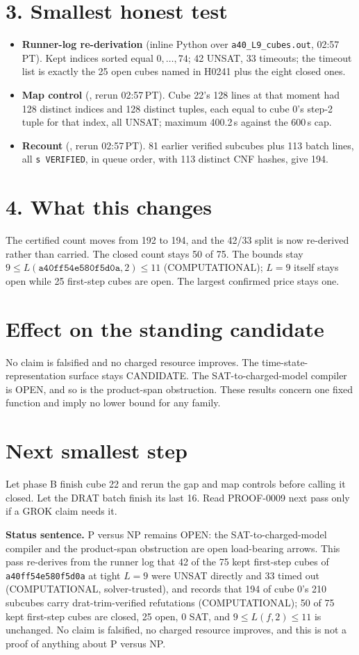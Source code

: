 \documentclass[11pt]{article}
\begin{document}
\section*{3. Smallest honest test}
\begin{itemize}
\item \textbf{Runner-log re-derivation} (inline Python over \texttt{a40\_L9\_cubes.out}, 02:57\,PT). Kept indices sorted equal $0,\dots,74$; 42 UNSAT, 33 timeouts; the timeout list is exactly the 25 open cubes named in H0241 plus the eight closed ones.
\item \textbf{Map control} (, rerun 02:57\,PT). Cube 22's 128 lines at that moment had 128 distinct indices and 128 distinct tuples, each equal to cube 0's step-2 tuple for that index, all UNSAT; maximum 400.2\,s against the 600\,s cap.
\item \textbf{Recount} (, rerun 02:57\,PT). 81 earlier verified subcubes plus 113 batch lines, all \texttt{s VERIFIED}, in queue order, with 113 distinct CNF hashes, give 194.
\end{itemize}

\section*{4. What this changes}
The certified count moves from 192 to 194, and the 42/33 split is now re-derived rather than carried. The closed count stays 50 of 75. The bounds stay $9\le L(\texttt{a40ff54e580f5d0a},2)\le 11$ (COMPUTATIONAL); $L=9$ itself stays open while 25 first-step cubes are open. The largest confirmed price stays one.

\section*{Effect on the standing candidate}
No claim is falsified and no charged resource improves. The time-state-representation surface stays CANDIDATE. The SAT-to-charged-model compiler is OPEN, and so is the product-span obstruction. These results concern one fixed function and imply no lower bound for any family.

\section*{Next smallest step}
Let phase B finish cube 22 and rerun the gap and map controls before calling it closed. Let the DRAT batch finish its last 16. Read PROOF-0009 next pass only if a GROK claim needs it.

\bigskip
\noindent\textbf{Status sentence.} P versus NP remains OPEN: the SAT-to-charged-model compiler and the product-span obstruction are open load-bearing arrows. This pass re-derives from the runner log that 42 of the 75 kept first-step cubes of \texttt{a40ff54e580f5d0a} at tight $L=9$ were UNSAT directly and 33 timed out (COMPUTATIONAL, solver-trusted), and records that 194 of cube 0's 210 subcubes carry drat-trim-verified refutations (COMPUTATIONAL); 50 of 75 kept first-step cubes are closed, 25 open, 0 SAT, and $9\le L(f,2)\le 11$ is unchanged. No claim is falsified, no charged resource improves, and this is not a proof of anything about P versus NP.
\end{document}
